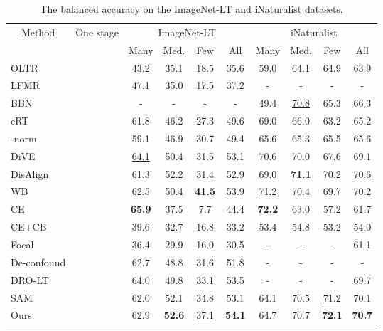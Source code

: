 \begin{table*}[t]
    \centering
    \caption{The balanced accuracy on the ImageNet-LT and iNaturalist datasets.}
    \renewcommand{\arraystretch}{0.9}
    \begin{tabular}{l|c|cccc|cccc}
      \toprule
      \multicolumn{1}{c}{\multirow{2}[4]{*}{Method}} & \multicolumn{1}{c}{\multirow{2}[4]{*}{One stage}} & \multicolumn{4}{c}{ImageNet-LT} & \multicolumn{4}{c}{iNaturalist} \\
  \cmidrule{3-10}    \multicolumn{1}{c}{} & \multicolumn{1}{c}{} & Many  &  Med. & Few   & \multicolumn{1}{c}{All } & Many  &  Med. & Few   & All  \\
      \midrule
      OLTR \cite{DBLP:conf/cvpr/0002MZWGY19}  &  & 43.2  & 35.1  & 18.5  & 35.6  & 59.0  & 64.1  & 64.9  & 63.9  \\
      LFMR \cite{DBLP:conf/eccv/XiangDH20}  &  & 47.1  & 35.0  & 17.5  & 37.2  & -     & -     & -     & - \\
      BBN \cite{DBLP:conf/cvpr/ZhouCWC20}  &  & -     & -     & -     & -     & 49.4  & \underline{70.8}  & 65.3  & 66.3  \\
      cRT \cite{DBLP:conf/iclr/KangXRYGFK20}  &  & 61.8  & 46.2  & 27.3  & 49.6  & 69.0  & 66.0  & 63.2  & 65.2  \\
      -norm \cite{DBLP:conf/iclr/KangXRYGFK20} &  & 59.1  & 46.9  & 30.7  & 49.4  & 65.6  & 65.3  & 65.5  & 65.6  \\
      DiVE \cite{DBLP:conf/iccv/HeWW21}  &  & \underline{64.1}  & 50.4  & 31.5  & 53.1  & 70.6  & 70.0  & 67.6  & 69.1  \\
      DisAlign \cite{DBLP:conf/cvpr/ZhangLY0S21} &  & 61.3  & \underline{52.2}  & 31.4  & 52.9  & 69.0  & \textbf{71.1}  & 70.2  & \underline{70.6}  \\
      WB \cite{DBLP:conf/cvpr/AlshammariWRK22}   &  & 62.5  & 50.4  & \textbf{41.5}  & \underline{53.9}  & \underline{71.2}  & 70.4  & 69.7  & 70.2  \\
      \midrule
      CE \cite{DBLP:conf/iclr/KangXRYGFK20}   &  & \textbf{65.9}  & 37.5  & 7.7   & 44.4  & \textbf{72.2}  & 63.0  & 57.2  & 61.7  \\
      CE+CB \cite{DBLP:conf/cvpr/CuiJLSB19} &  & 39.6  & 32.7  & 16.8  & 33.2  & 53.4  & 54.8  & 53.2  & 54.0  \\
      Focal \cite{DBLP:conf/cvpr/CuiJLSB19} &  & 36.4  & 29.9  & 16.0  & 30.5  & -     & -     & -     & 61.1  \\
      De-confound \cite{DBLP:conf/nips/TangHZ20} &  & 62.7  & 48.8  & 31.6  & 51.8  & -     & -     & -     & - \\
      DRO-LT \cite{DBLP:conf/iccv/SamuelC21} &  & 64.0  & 49.8  & 33.1  & 53.5  & -     & -     & -     & 69.7  \\
      SAM \cite{rangwani2022escaping} &  & 62.0  & 52.1  & 34.8  & 53.1  & 64.1  & 70.5  & \underline{71.2}  & 70.1  \\
      \midrule
      Ours &  & 62.9  & \textbf{52.6}  & \underline{37.1}  & \textbf{54.1}  & 64.7  & 70.7  & \textbf{72.1}  & \textbf{70.7}  \\
      \bottomrule
    \end{tabular}\label{tab:ima_ina}\end{table*}


